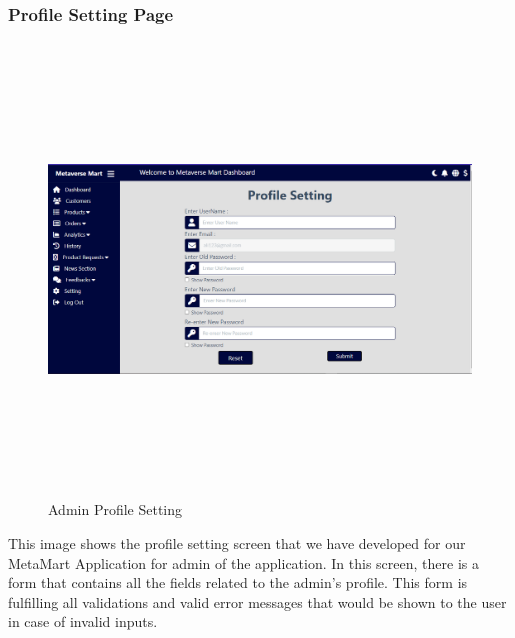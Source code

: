 \subsubsection{Profile Setting Page}
\begin{figure}[H]
    \centering
    \includegraphics[width=15cm,height=12cm]{Figures/Diagrams/ProfileSetting.PNG}
    \caption{Admin Profile Setting}
    \label{Admin Profile Setting Page}
\end{figure}
\justifying
This image shows the profile setting screen that we have developed for our MetaMart Application for admin of the application. In this screen, there is a form that contains all the fields related to the admin’s profile. This form is fulfilling all validations and valid error messages that would be shown to the user in case of invalid inputs.
